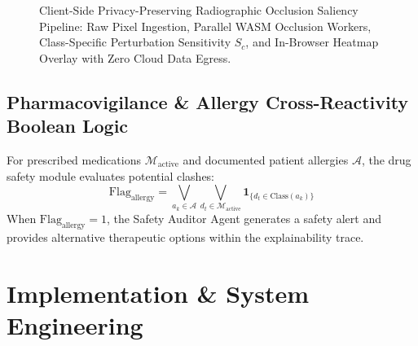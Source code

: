 \documentclass[journal,10pt,twocolumn]{IEEEtran}
\begin{document}
\begin{figure}[!t]
\caption{Client-Side Privacy-Preserving Radiographic Occlusion Saliency Pipeline: Raw Pixel Ingestion, Parallel WASM Occlusion Workers, Class-Specific Perturbation Sensitivity $S_c$, and In-Browser Heatmap Overlay with Zero Cloud Data Egress.}
\label{fig:saliency_pipeline}
\end{figure}

\subsection{Pharmacovigilance \& Allergy Cross-Reactivity Boolean Logic}
For prescribed medications $\mathcal{M}_{\text{active}}$ and documented patient allergies $\mathcal{A}$, the drug safety module evaluates potential clashes:
\begin{equation}
\text{Flag}_{\text{allergy}} = \bigvee_{a_k \in \mathcal{A}} \bigvee_{d_t \in \mathcal{M}_{\text{active}}} \mathbf{1}_{\{d_t \in \text{Class}(a_k)\}}
\end{equation}
When $\text{Flag}_{\text{allergy}} = 1$, the Safety Auditor Agent generates a safety alert and provides alternative therapeutic options within the explainability trace.

\section{Implementation \& System Engineering}
\end{document}
